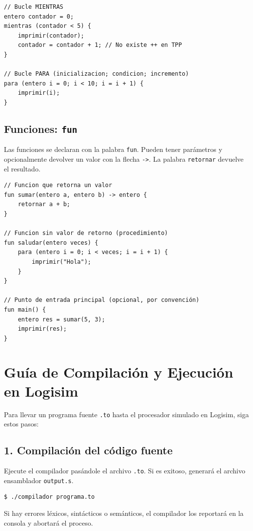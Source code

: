 \begin{lstlisting}[style=tppstyle, caption={Uso de bucles}]
// Bucle MIENTRAS
entero contador = 0;
mientras (contador < 5) {
    imprimir(contador);
    contador = contador + 1; // No existe ++ en TPP
}

// Bucle PARA (inicializacion; condicion; incremento)
para (entero i = 0; i < 10; i = i + 1) {
    imprimir(i);
}
\end{lstlisting}

\subsection{Funciones: \texttt{fun}}

Las funciones se declaran con la palabra \texttt{fun}. Pueden tener parámetros y opcionalmente devolver un valor con la flecha \texttt{->}. La palabra \texttt{retornar} devuelve el resultado.

\begin{lstlisting}[style=tppstyle, caption={Definicion de funciones}]
// Funcion que retorna un valor
fun sumar(entero a, entero b) -> entero {
    retornar a + b;
}

// Funcion sin valor de retorno (procedimiento)
fun saludar(entero veces) {
    para (entero i = 0; i < veces; i = i + 1) {
        imprimir("Hola");
    }
}

// Punto de entrada principal (opcional, por convención)
fun main() {
    entero res = sumar(5, 3);
    imprimir(res);
}
\end{lstlisting}

\section{Guía de Compilación y Ejecución en Logisim}

Para llevar un programa fuente \texttt{.to} hasta el procesador simulado en Logisim, siga estos pasos:

\subsection{1. Compilación del código fuente}

Ejecute el compilador pasándole el archivo \texttt{.to}. Si es exitoso, generará el archivo ensamblador \texttt{output.s}.

\begin{lstlisting}[language=bash, style=cstyle]
$ ./compilador programa.to
\end{lstlisting}
Si hay errores léxicos, sintácticos o semánticos, el compilador los reportará en la consola y abortará el proceso.

